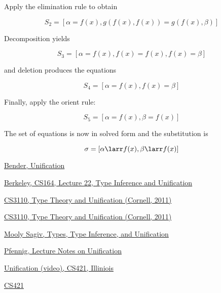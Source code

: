 Apply the elimination rule to obtain 

\begin{equation}
S_2 = [\alpha = f(x), g(f(x), f(x)) = g(f(x), \beta)]
\end{equation}

Decomposition yields

\begin{equation}
S_3 = [\alpha = f(x), f(x) = f(x), f(x) = \beta]
\end{equation}

and deletion produces the equations 

\begin{equation}
S_4 = [\alpha = f(x), f(x) = \beta]
\end{equation}

Finally, apply the orient rule:

\begin{equation}
S_5 = [\alpha = f(x), \beta = f(x)]
\end{equation}

The set of equations is now in solved form and the substitution is 

\begin{equation}
\sigma = [\alpha \larr f(x), \beta \larr f(x)]
\end{equation}

\bigskip



\bigskip

\begin{thebibliography}

 \href{https://www.cs.unh.edu/~ruml/cs730/unification.pdf}{Bender, Unification}

 \href{https://inst.eecs.berkeley.edu/~cs164/sp11/lectures/lecture22.pdf}{Berkeley, CS164, Lecture 22, Type Inference and Unification} $\quad$ 

 \href{https://www.cs.cornell.edu/courses/cs3110/2011sp/Lectures/lec26-type-inference/type-inference.htm}{CS3110, Type Theory and Unification (Cornell, 2011)} $\quad$ 

 \href{https://www.cs.cornell.edu/courses/cs6110/2017sp/lectures/lec23.pdf}{CS3110, Type Theory and Unification (Cornell, 2011)} 

 \href{http://www.cs.tau.ac.il/~msagiv/courses/pl16/types.pdf}{Mooly Sagiv, Types, Type Inference, and Unification} $\quad$ 

 \href{https://www.cs.cmu.edu/~fp/courses/15816-s12/lectures/19-unif.pdf}{Pfennig, Lecture Notes on Unification}

 \href{https://pages.github-dev.cs.illinois.edu/cs421-sp18/web/videos/unification/}{Unification (video), CS421, Illiniois}

 \href{https://pages.github-dev.cs.illinois.edu/cs421-sp18/web/pages/lectures/}{CS421}

\end{thebibliography}

